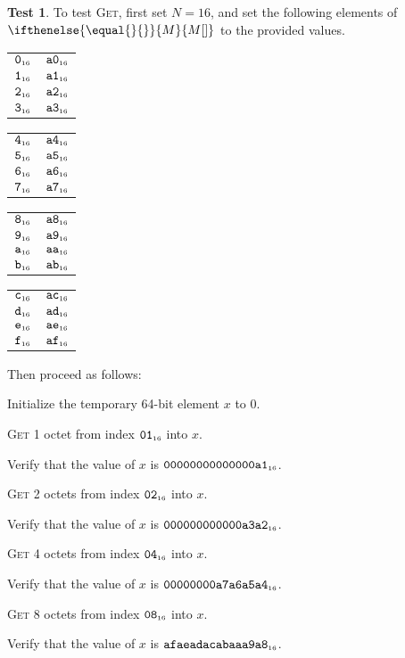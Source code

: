 \documentclass[a4paper,12pt]{article}
\makeatletter
\newcommand{\num}[1]{\texttt{\MakeLowercase{#1}}}
\newcommand{\hex}[1]{\num{#1}_{\textup{\tiny 16}}}
\newcommand{\MEM}[1]{\ifthenelse{\equal{#1}{}}{M}{M[#1]}}
\newcommand{\proc}[1]{\textsc{#1}}
\theoremstyle{definition}
\newtheorem{test}{Test}
\newenvironment{memtable}{%
  \begin{trivlist}
    \item
    }{%
    \end{trivlist}}
\newenvironment{memcolumn}{%
  \begin{tabular}{@{}ll@{}}
    \hline}
    {%
    \hline
  \end{tabular}}
\newcommand{\memspace}{\qquad}
\makeatother
\begin{document}
\begin{test}
  To test \proc{Get}, first set $N=16$, and set the following elements of $\MEM{}$ to the provided values.
  \begin{memtable}
    \begin{memcolumn}
      $\hex{0}$ & $\hex{A0}$ \\
      $\hex{1}$ & $\hex{A1}$ \\
      $\hex{2}$ & $\hex{A2}$ \\
      $\hex{3}$ & $\hex{A3}$ \\
    \end{memcolumn}
    \memspace
    \begin{memcolumn}
      $\hex{4}$ & $\hex{A4}$ \\
      $\hex{5}$ & $\hex{A5}$ \\
      $\hex{6}$ & $\hex{A6}$ \\
      $\hex{7}$ & $\hex{A7}$ \\
    \end{memcolumn}
    \memspace
    \begin{memcolumn}
      $\hex{8}$ & $\hex{A8}$ \\
      $\hex{9}$ & $\hex{A9}$ \\
      $\hex{A}$ & $\hex{AA}$ \\
      $\hex{B}$ & $\hex{AB}$ \\
    \end{memcolumn}
    \memspace
    \begin{memcolumn}
      $\hex{C}$ & $\hex{AC}$ \\
      $\hex{D}$ & $\hex{AD}$ \\
      $\hex{E}$ & $\hex{AE}$ \\
      $\hex{F}$ & $\hex{AF}$ \\
    \end{memcolumn}
  \end{memtable}
  Then proceed as follows:
  \begin{stepnumbers}
  \item Initialize the temporary 64-bit element $x$ to $0$.
  \item \proc{Get} 1 octet  from index $\hex{01}$ into $x$.
  \item Verify that the value of $x$ is $\hex{00000000000000A1}$.
  \item \proc{Get} 2 octets from index $\hex{02}$ into $x$.
  \item Verify that the value of $x$ is $\hex{000000000000A3A2}$.
  \item \proc{Get} 4 octets from index $\hex{04}$ into $x$.
  \item Verify that the value of $x$ is $\hex{00000000A7A6A5A4}$.
  \item \proc{Get} 8 octets from index $\hex{08}$ into $x$.
  \item Verify that the value of $x$ is $\hex{AFAEADACABAAA9A8}$.
  \end{stepnumbers}
\end{test}
\end{document}
